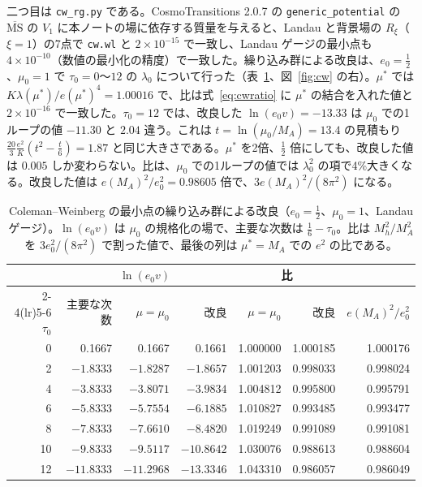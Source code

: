 \documentclass[a4paper,10pt]{ltjsarticle}
\newcommand{\MSbar}{\overline{\mathrm{MS}}}
\begin{document}
二つ目は \texttt{cw\_rg.py} である。CosmoTransitions 2.0.7 の \texttt{generic\_potential} の $\MSbar$ の $V_1$ に本ノートの場に依存する質量を与えると、Landau と背景場の $R_\xi$（$\xi=1$）の7点で \texttt{cw.wl} と $2\times10^{-15}$ で一致し、Landau ゲージの最小点も $4\times10^{-10}$（数値の最小化の精度）で一致した。繰り込み群による改良は、$e_0=\frac12$、$\mu_0=1$ で $\tau_0=0$〜$12$ の $\lambda_0$ について行った（表~\ref{tab:cw}、図~\ref{fig:cw} の右）。$\mu^*$ では $K\lambda(\mu^*)/e(\mu^*)^4=1.00016$ で、比は式~\eqref{eq:cwratio} に $\mu^*$ の結合を入れた値と $2\times10^{-16}$ で一致した。$\tau_0=12$ では、改良した $\ln(e_0v)=-13.33$ は $\mu_0$ での1ループの値 $-11.30$ と $2.04$ 違う。これは $t=\ln(\mu_0/M_A)=13.4$ の見積もり $\frac{20}3\frac{e^2}K(t^2-\frac t6)=1.87$ と同じ大きさである。$\mu^*$ を2倍、$\frac12$ 倍にしても、改良した値は $0.005$ しか変わらない。比は、$\mu_0$ での1ループの値では $\lambda_0^2$ の項で4\%大きくなる。改良した値は $e(M_A)^2/e_0^2=0.98605$ 倍で、$3e(M_A)^2/(8\pi^2)$ になる。

\begin{table}[tbp]
\centering\small
\caption{Coleman--Weinberg の最小点の繰り込み群による改良（$e_0=\frac12$、$\mu_0=1$、Landau ゲージ）。$\ln(e_0v)$ は $\mu_0$ の規格化の場で、主要な次数は $\frac16-\tau_0$。比は $M_h^2/M_A^2$ を $3e_0^2/(8\pi^2)$ で割った値で、最後の列は $\mu^*=M_A$ での $e^2$ の比である。}
\label{tab:cw}
\begin{tabular}{rrrrrrr}
\toprule
& \multicolumn{3}{c}{$\ln(e_0v)$} & \multicolumn{2}{c}{比} & \\
\cmidrule(lr){2-4}\cmidrule(lr){5-6}
$\tau_0$ & 主要な次数 & $\mu=\mu_0$ & 改良 & $\mu=\mu_0$ & 改良 & $e(M_A)^2/e_0^2$ \\
\midrule
0 & 0.1667 & 0.1667 & 0.1661 & 1.000000 & 1.000185 & 1.000176 \\
2 & $-1.8333$ & $-1.8287$ & $-1.8657$ & 1.001203 & 0.998033 & 0.998024 \\
4 & $-3.8333$ & $-3.8071$ & $-3.9834$ & 1.004812 & 0.995800 & 0.995791 \\
6 & $-5.8333$ & $-5.7554$ & $-6.1885$ & 1.010827 & 0.993485 & 0.993477 \\
8 & $-7.8333$ & $-7.6610$ & $-8.4820$ & 1.019249 & 0.991089 & 0.991081 \\
10 & $-9.8333$ & $-9.5117$ & $-10.8642$ & 1.030076 & 0.988613 & 0.988604 \\
12 & $-11.8333$ & $-11.2968$ & $-13.3346$ & 1.043310 & 0.986057 & 0.986049 \\
\bottomrule
\end{tabular}
\end{table}
\end{document}
